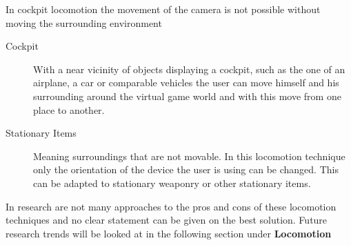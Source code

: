 In cockpit locomotion the movement of the camera is not possible without moving 
the surrounding environment
\begin{description}
	\item[Cockpit]With a near vicinity of objects displaying a cockpit, such as 
	the one of an airplane, a car or comparable vehicles the user can move 
	himself and his surrounding around the virtual game world and with this 
	move from one place to another.
	\item[Stationary Items]Meaning surroundings that are not movable. In this 
	locomotion technique only the orientation of the device the user is using 
	can be changed. This can be adapted to stationary weaponry or other 
	stationary items.
\end{description}

In research are not many approaches to the pros and cons of these locomotion 
techniques and no clear statement can be given on the best solution. 
Future research trends will be looked at in the following section under 
\textbf{Locomotion}

